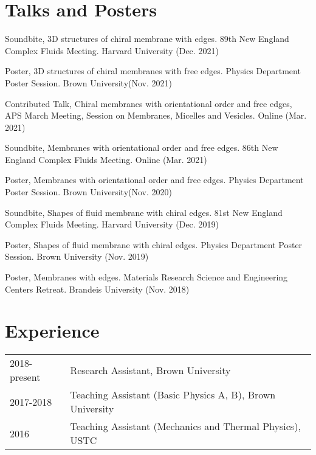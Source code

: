 \documentclass[11pt,letterpaper]{article}
\begin{document}
\section*{Talks and Posters}
\begin{etaremune}
    \item Soundbite, 3D structures of chiral membrane with edges. 89th New England Complex Fluids Meeting. Harvard University (Dec. 2021)
    \item Poster, 3D structures of chiral membranes with free edges. Physics Department Poster Session. Brown University(Nov. 2021)
    \item Contributed Talk, Chiral membranes with orientational order and free edges, APS March Meeting, Session on Membranes, Micelles and Vesicles. Online (Mar. 2021)
    \item Soundbite, Membranes with orientational order and free edges. 86th New England Complex Fluids Meeting. Online (Mar. 2021)
    \item Poster, Membranes with orientational order and free edges. Physics Department Poster Session. Brown University(Nov. 2020)
    \item Soundbite, Shapes of fluid membrane with chiral edges. 81st New England Complex Fluids Meeting. Harvard University (Dec. 2019)
    \item Poster, Shapes of fluid membrane with chiral edges. Physics Department Poster Session. Brown University (Nov. 2019)
    \item Poster, Membranes with edges. Materials Research Science and Engineering Centers Retreat. Brandeis University (Nov. 2018)
\end{etaremune}

\section*{Experience}
\vspace*{-0.15in}
\begin{longtable}{l p{\linewidth}}
    2018-present & Research Assistant, Brown University                      \\
    2017-2018    & Teaching Assistant (Basic Physics A, B), Brown University \\
    2016         & Teaching Assistant (Mechanics and Thermal Physics), USTC
\end{longtable}
\end{document}
